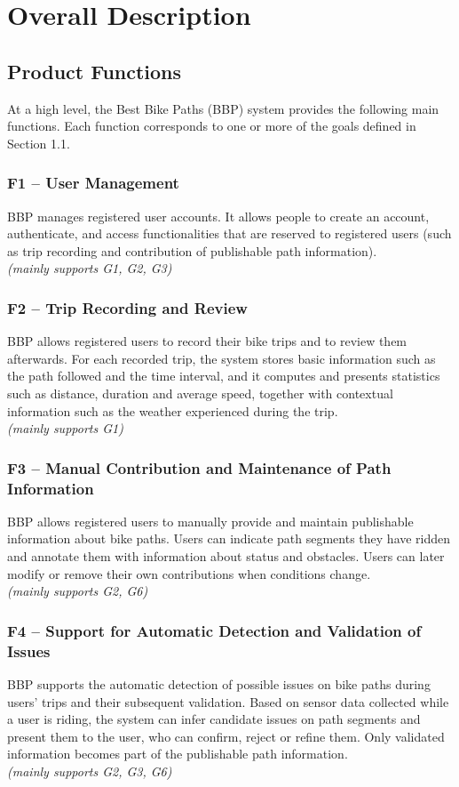\section{Overall Description}
\subsection{Product Functions}

At a high level, the Best Bike Paths (BBP) system provides the following main functions.
Each function corresponds to one or more of the goals defined in Section 1.1.

\subsubsection*{F1 -- User Management}
BBP manages registered user accounts. It allows people to create an account, authenticate, 
and access functionalities that are reserved to registered users (such as trip recording and 
contribution of publishable path information).\\
\textit{(mainly supports G1, G2, G3)}

\subsubsection*{F2 -- Trip Recording and Review}
BBP allows registered users to record their bike trips and to review them afterwards. 
For each recorded trip, the system stores basic information such as the path followed and 
the time interval, and it computes and presents statistics such as distance, duration and 
average speed, together with contextual information such as the weather experienced during 
the trip.\\
\textit{(mainly supports G1)}

\subsubsection*{F3 -- Manual Contribution and Maintenance of Path Information}
BBP allows registered users to manually provide and maintain publishable information about 
bike paths. Users can indicate path segments they have ridden and annotate them with 
information about status and obstacles. Users can later modify or remove their own 
contributions when conditions change.\\
\textit{(mainly supports G2, G6)}

\subsubsection*{F4 -- Support for Automatic Detection and Validation of Issues}
BBP supports the automatic detection of possible issues on bike paths during users’ trips 
and their subsequent validation. Based on sensor data collected while a user is riding, the 
system can infer candidate issues on path segments and present them to the user, who can 
confirm, reject or refine them. Only validated information becomes part of the publishable 
path information.\\
\textit{(mainly supports G2, G3, G6)}

